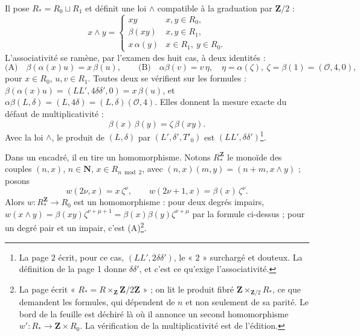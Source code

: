 \documentclass[11pt,a4paper]{article}
\begin{document}
Il pose $R_* = R_0 \sqcup R_1$ et définit une loi $\wedge$ compatible à la
graduation par $\mathbf{Z}/2$ :
\[
  x \wedge y = \begin{cases}
    xy & x, y \in R_0, \\
    \beta(xy) & x, y \in R_1, \\
    x\,\alpha(y) & x \in R_1,\ y \in R_0 .
  \end{cases}
\]
L'associativité se ramène, par l'examen des huit cas, à deux identités :
\[
  \text{(A)} \quad \beta(\alpha(x)u) = x\,\beta(u), \qquad
  \text{(B)} \quad \alpha\beta(v) = v\,\eta, \quad \eta = \alpha(\zeta), \ \zeta = \beta(1) = (\mathcal{O}, 4, 0),
\]
pour $x \in R_0$, $u, v \in R_1$. Toutes deux se vérifient sur les formules :
$\beta(\alpha(x)u) = (LL', 4\delta\delta', 0) = x\,\beta(u)$, et
$\alpha\beta(L, \delta) = (L, 4\delta) = (L, \delta)(\mathcal{O}, 4)$. Elles donnent
la mesure exacte du défaut de multiplicativité :
\[
  \beta(x)\,\beta(y) = \zeta\,\beta(xy).
\]
Avec la loi $\wedge$, le produit de $(L, \delta)$ par $(L', \delta', T'_0)$ est
$(LL', \delta\delta')$\footnote{La page 2 écrit, pour ce cas, $(LL', 2\delta\delta')$,
le « $2$ » surchargé et douteux. La définition de la page 1 donne
$\delta\delta'$, et c'est ce qu'exige l'associativité.}.

Dans un encadré, il en tire un homomorphisme. Notons $R_*^{\mathbf{Z}}$ le monoïde
des couples $(n, x)$, $n \in \mathbf{N}$, $x \in R_{n \bmod 2}$, avec
$(n, x)(m, y) = (n + m, x \wedge y)$ ; posons
\[
  w(2\nu, x) = x\,\zeta^{\nu}, \qquad w(2\nu + 1, x) = \beta(x)\,\zeta^{\nu} .
\]
Alors $w : R_*^{\mathbf{Z}} \to R_0$ est un homomorphisme : pour deux degrés
impairs, $w(x \wedge y) = \beta(xy)\zeta^{\nu + \mu + 1} = \beta(x)\beta(y)\zeta^{\nu+\mu}$
par la formule ci-dessus ; pour un degré pair et un impair, c'est (A)\footnote{La
page écrit « $R_* = R \times_{\mathbf{Z}} \mathbf{Z}/2\mathbf{Z}$ » ; on lit le produit
fibré $\mathbf{Z} \times_{\mathbf{Z}/2} R_*$, ce que demandent les formules, qui
dépendent de $n$ et non seulement de sa parité. Le bord de la feuille est déchiré
là où il annonce un second homomorphisme $w' : R_* \to \mathbf{Z} \times R_0$. La
vérification de la multiplicativité est de l'édition.}.
\end{document}
